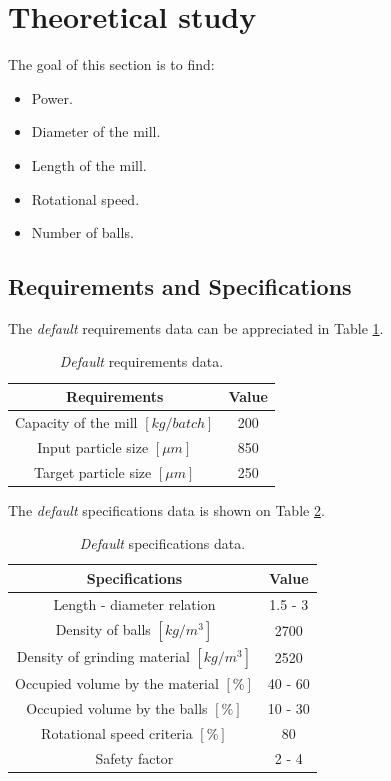 \section{Theoretical study}

The goal of this section is to find:

\begin{itemize}
	\item Power.
	\item Diameter of the mill.
	\item Length of the mill.
	\item Rotational speed.
	\item Number of balls.
\end{itemize}

\subsection{Requirements and Specifications}

The \textit{default} requirements data can be appreciated in Table \ref{req}.

\begin{table}[H]
\centering
\begin{tabular}{cc}
\hline
\textbf{Requirements} & \textbf{Value} \\ \hline \hline
Capacity of the mill $[kg/batch]$ & 200 \\ 
Input particle size $\left[\mu m \right]$ & 850 \\
Target particle size $\left[\mu m \right]$ & 250 \\ \hline
\end{tabular}
\caption{\textit{Default} requirements data.}
\label{req}
\end{table}

The \textit{default} specifications data is shown on Table \ref{spec}.

\begin{table}[H]
\centering
\begin{tabular}{cc}
\hline
\textbf{Specifications} & \textbf{Value} \\ \hline \hline
Length - diameter relation & 1.5 - 3 \\ 
Density of balls $\left[kg / m^3 \right]$ & 2700 \\
Density of grinding material $\left[kg / m^3 \right]$ & 2520 \\ 
Occupied volume by the material $[\%]$ & 40 - 60 \\
Occupied volume by the balls $[\%]$ & 10 - 30 \\
Rotational speed criteria $[\%]$ & 80 \\
Safety factor & 2 - 4 \\ \hline
\end{tabular}
\caption{\textit{Default} specifications data.}
\label{spec}
\end{table}

